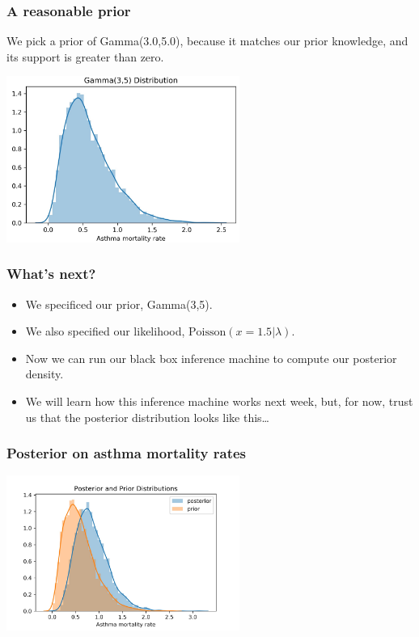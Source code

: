 \documentclass{beamer}
\begin{document}
\begin{frame}
\frametitle{A reasonable prior}

We pick a prior of Gamma(3.0,5.0), because it matches our prior knowledge, and its support is greater than zero.

\begin{center}
\includegraphics[width=3in]{gamma_3_5_pdf.jpg}
\end{center}


\end{frame}

\begin{frame}
\frametitle{What's next?}

\begin{itemize}
	\item We specificed our prior, Gamma(3,5).
	\item We also specified our likelihood, $\textrm{Poisson}(x=1.5 | \lambda)$.
	\item Now we can run our black box inference machine to compute our posterior density.
	\item We will learn how this inference machine works next week, but, for now, trust us that the posterior distribution looks like this\ldots
\end{itemize}

\end{frame}


\begin{frame}
\frametitle{Posterior on asthma mortality rates}

\begin{center}
\includegraphics[width=3in]{asthma_posterior.jpg}
\end{center}


\end{frame}
\end{document}
